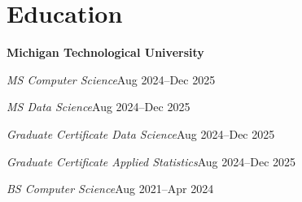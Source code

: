 \section*{Education}
\textbf{Michigan Technological University}

\textit{MS Computer Science}\hfill Aug 2024–Dec 2025

\textit{MS Data Science}\hfill Aug 2024–Dec 2025

\textit{Graduate Certificate Data Science}\hfill Aug 2024–Dec 2025

\textit{Graduate Certificate Applied Statistics}\hfill Aug 2024–Dec 2025

\textit{BS Computer Science}\hfill Aug 2021–Apr 2024
